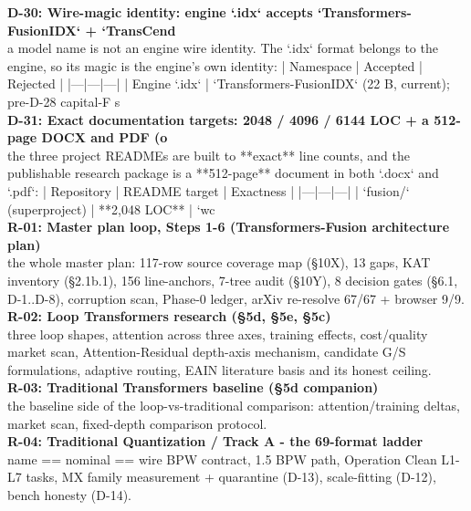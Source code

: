 {\noindent\textbf{D-30: Wire-magic identity: engine `.idx` accepts `Transformers-FusionIDX` + `TransCend}\\
\noindent a model name is not an engine wire identity. The `.idx` format belongs to the engine, so its magic is the engine's own identity:  | Namespace | Accepted | Rejected | |---|---|---| | Engine `.idx` | `Transformers-FusionIDX` (22 B, current); pre-D-28 capital-F s\\

\noindent\textbf{D-31: Exact documentation targets: 2048 / 4096 / 6144 LOC + a 512-page DOCX and PDF (o}\\
\noindent the three project READMEs are built to **exact** line counts, and the publishable research package is a **512-page** document in both `.docx` and `.pdf`:  | Repository | README target | Exactness | |---|---|---| | `fusion/` (superproject) | **2,048 LOC** | `wc\\

\noindent\textbf{R-01: Master plan loop, Steps 1-6 (Transformers-Fusion architecture plan)}\\
\noindent the whole master plan: 117-row source coverage map (§10X), 13 gaps, KAT inventory   (§2.1b.1), 156 line-anchors, 7-tree audit (§10Y), 8 decision gates (§6.1, D-1..D-8),   corruption scan, Phase-0 ledger, arXiv re-resolve 67/67 + browser 9/9.\\

\noindent\textbf{R-02: Loop Transformers research (§5d, §5e, §5c)}\\
\noindent three loop shapes, attention across three axes, training effects, cost/quality   market scan, Attention-Residual depth-axis mechanism, candidate G/S formulations, adaptive   routing, EAIN literature basis and its honest ceiling.\\

\noindent\textbf{R-03: Traditional Transformers baseline (§5d companion)}\\
\noindent the baseline side of the loop-vs-traditional comparison: attention/training deltas,   market scan, fixed-depth comparison protocol.\\

\noindent\textbf{R-04: Traditional Quantization / Track A - the 69-format ladder}\\
\noindent name == nominal == wire BPW contract, 1.5 BPW path, Operation Clean L1-L7 tasks,   MX family measurement + quarantine (D-13), scale-fitting (D-12), bench honesty (D-14).\\

}
